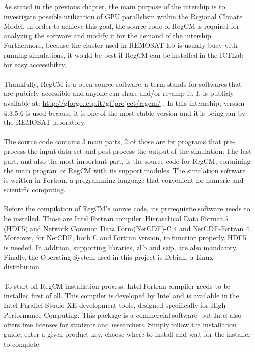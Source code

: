 As stated in the previous chapter, the main purpose of the intership is to investigate possible utilization of GPU parallelism within the Regional Climate Model. In order to achieve this goal, the source code of RegCM is required for analyzing the software and modify it for the demand of the intership. Furthermore, because the cluster used in REMOSAT lab is usually busy with running simulations, it would be best if RegCM can be installed in the ICTLab for easy accessibility. \\
~\\
Thankfully, RegCM is a open-source software, a term stands for softwares that are publicly accessible and anyone can share and/or revamp it. It is publicly available at: \url{http://gforge.ictp.it/gf/project/regcm/} . In this internship, version 4.3.5.6 is used because it is one of the most stable version and it is being ran by the REMOSAT laboratory. \\
~\\
The source code contains 3 main parts, 2 of those are for programs that pre-process the input data set and post-process the output of the simulation. The last part, and also the most important part, is the source code for RegCM, containing the main program of RegCM with its support modules. The simulation software is written in Fortran, a programming language that convenient for numeric and scientific computing. \\
~\\
Before the compilation of RegCM's source code, its prerequisite software needs to be installed. Those are Intel Fortran compiler, Hierarchical Data Format 5 (HDF5) and Network Common Data Form(NetCDF)-C 4 and NetCDF-Fortran 4. Moreover, for NetCDF, both C and Fortran version, to function properly, HDF5 is needed. In addition, supporting libraries, zlib and szip, are also mandatory. Finally, the Operating System used in this project is Debian, a Linux-distribution. \\
~\\
To start off RegCM installation process, Intel Fortran compiler needs to be installed first of all. This compiler is developed by Intel and is available in the Intel Parallel Studio XE development tools, designed specifically for High Performance Computing. This package is a commercial software, but Intel also offers free licenses for students and researchers. Simply follow the installation guide, enter a given product key, choose where to install and wait for the installer to complete. \\
